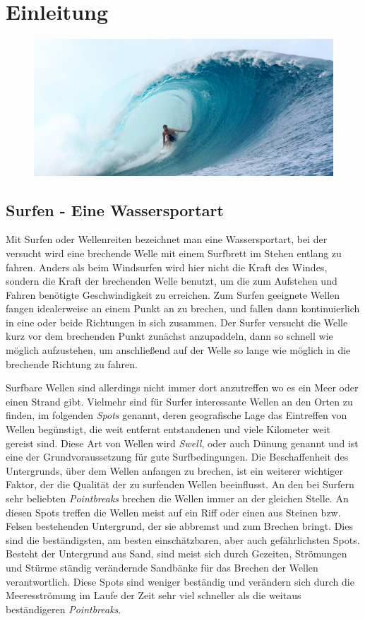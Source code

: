 
\chapter{Einleitung}

\begin{figure}[h]
  \includegraphics[width=\textwidth]{bilder/intro}
\end{figure}

\section{Surfen - Eine Wassersportart}
Mit Surfen oder Wellenreiten bezeichnet man eine Wassersportart, bei
der versucht wird eine brechende Welle mit einem Surfbrett im Stehen
entlang zu fahren. Anders als beim Windsurfen wird hier nicht die
Kraft des Windes, sondern die Kraft der brechenden Welle benutzt, um
die zum Aufstehen und Fahren benötigte Geschwindigkeit zu
erreichen. Zum Surfen geeignete Wellen fangen idealerweise an einem
Punkt an zu brechen, und fallen dann kontinuierlich in eine oder beide
Richtungen in sich zusammen. Der Surfer versucht die Welle kurz vor
dem brechenden Punkt zunächst anzupaddeln, dann so schnell wie möglich
aufzustehen, um anschließend auf der Welle so lange wie möglich in die
brechende Richtung zu fahren.

Surfbare Wellen sind allerdings nicht immer dort anzutreffen wo es ein
Meer oder einen Strand gibt. Vielmehr sind für Surfer interessante
Wellen an den Orten zu finden, im folgenden \textit{Spots} genannt,
deren geografische Lage das Eintreffen von Wellen begünstigt, die weit
entfernt entstandenen und viele Kilometer weit gereist sind. Diese Art
von Wellen wird \textit{Swell}, oder auch Dünung genannt und ist eine
der Grundvoraussetzung für gute Surfbedingungen. Die Beschaffenheit
des Untergrunds, über dem Wellen anfangen zu brechen, ist ein weiterer
wichtiger Faktor, der die Qualität der zu surfenden Wellen
beeinflusst. An den bei Surfern sehr beliebten \textit{Pointbreaks}
brechen die Wellen immer an der gleichen Stelle. An diesen Spots
treffen die Wellen meist auf ein Riff oder einen aus Steinen
bzw. Felsen bestehenden Untergrund, der sie abbremst und zum Brechen
bringt. Dies sind die beständigsten, am besten einschätzbaren, aber
auch gefährlichsten Spots. Besteht der Untergrund aus Sand, sind meist
sich durch Gezeiten, Strömungen und Stürme ständig verändernde
Sandbänke für das Brechen der Wellen verantwortlich. Diese Spots sind
weniger beständig und verändern sich durch die Meeresströmung im Laufe
der Zeit sehr viel schneller als die weitaus beständigeren
\textit{Pointbreaks}.

